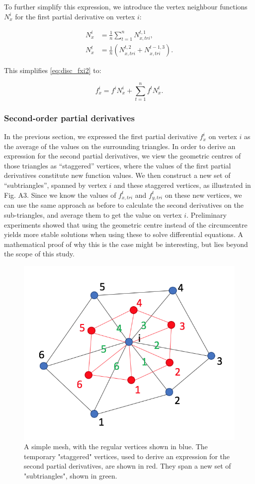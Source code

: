 \documentclass{article}
\begin{document}
To further simplify this expression, we introduce the vertex neighbour functions $N_x^i$ for the first partial derivative on vertex $i$:

\begin{equation} \label{eq:disc_Nx}
\begin{split}
 N_x^i &= \frac{1}{n} \sum_{t=1}^n N_{x,tri}^{t,1}, \\
 N_x^t &= \frac{1}{n} ( N_{x,tri}^{t,2} + N_{x,tri}^{t-1,3} ).
\end{split}
\end{equation}

This simplifies \eqref{eq:disc_fxi2} to:

\begin{equation} \label{eq:disc_fxi3}
f_x^i = f^i N_x^i + \sum_{t=1}^n f^t N_x^t.
\end{equation}

\subsubsection{Second-order partial derivatives}

In the previous section, we expressed the first partial derivative $f_x^i$ on vertex $i$ as the average of the values on the surrounding triangles. In order to derive an expression for the second partial derivatives, we view the geometric centres of those triangles as “staggered” vertices, where the values of the first partial derivatives constitute new function values. We then construct a new set of “subtriangles”, spanned by vertex $i$ and these staggered vertices, as illustrated in Fig. A3. Since we know the values of $f_{x,tri}^t$ and $f_{y,tri}^t$ on these new vertices, we can use the same approach as before to calculate the second derivatives on the sub-triangles, and average them to get the value on vertex $i$. Preliminary experiments showed that using the geometric centre instead of the circumcentre yields more stable solutions when using these to solve differential equations. A mathematical proof of why this is the case might be interesting, but lies beyond the scope of this study.

\begin{figure}[H] \label{fig:mesh_disc_02}
  \includegraphics[width=0.3\linewidth]{Fig_mesh_disc_02.png}
  \caption{A simple mesh, with the regular vertices shown in blue. The temporary "staggered" vertices, used to derive an expression for the second partial derivatives, are shown in red. They span a new set of "subtriangles", shown in green.}
\end{figure}
\end{document}
